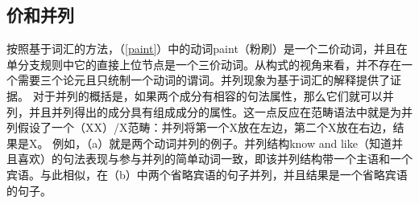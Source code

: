 \subsection{价和并列}
\label{coordination-sec}
    按照基于词汇的方法，（\ref{paint}）中的动词paint（粉刷）是一个二价动词，并且在单分支规则中它的直接上位节点是一个三价动词。从构式的视角来看，并不存在一个需要三个论元且只统制一个动词的谓词。并列现象为基于词汇的解释提供了证据。
    对于并列的概括是，如果两个成分有相容的句法属性，那么它们就可以并列，并且并列得出的成分具有组成成分的属性。这一点反应在范畴语法中就是为并列假设了一个（X\bs X）/X范畴：并列将第一个X放在左边，第二个X放在右边，结果是X。
    例如，（a）就是两个动词并列的例子。并列结构know and like（知道并且喜欢）的句法表现与参与并列的简单动词一致，即该并列结构带一个主语和一个宾语。与此相似，在（b）中两个省略宾语的句子并列，并且结果是一个省略宾语的句子。
\eal
{}
\zl
